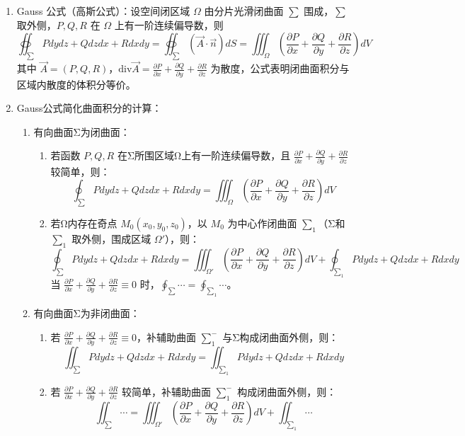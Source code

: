 \documentclass[UTF8]{ctexart}
\theoremstyle{remark}
\begin{document}
\begin{enumerate}
		\item Gauss 公式（高斯公式）：设空间闭区域 \(\Omega\) 由分片光滑闭曲面 \(\sum\) 围成，\(\sum\) 取外侧，\(P,Q,R\) 在 \(\Omega\) 上有一阶连续偏导数，则 
		\[
		\oiint_{\sum} P dydz + Q dzdx + R dxdy = \oiint_{\sum} (\vec{A}\cdot\vec{n}) dS = \iiint_{\Omega} \left(\frac{\partial P}{\partial x} + \frac{\partial Q}{\partial y} + \frac{\partial R}{\partial z}\right) dV
		\]
		其中 \(\vec{A}=(P,Q,R)\)，\(\text{div}\vec{A} = \frac{\partial P}{\partial x} + \frac{\partial Q}{\partial y} + \frac{\partial R}{\partial z}\) 为散度，公式表明闭曲面积分与区域内散度的体积分等价。
	
	\item Gauss公式简化曲面积分的计算：
	\begin{enumerate}
		\item 有向曲面Σ为闭曲面：
		\begin{enumerate}
			\item 若函数 \(P, Q, R\) 在Σ所围区域Ω上有一阶连续偏导数，且 \(\frac{\partial P}{\partial x} + \frac{\partial Q}{\partial y} + \frac{\partial R}{\partial z}\) 较简单，则：
			\[
			\oint_{\sum} P dydz + Q dzdx + R dxdy = \iiint_{\Omega} \left(\frac{\partial P}{\partial x} + \frac{\partial Q}{\partial y} + \frac{\partial R}{\partial z}\right) dV
			\]
			\item 若Ω内存在奇点 \(M_0(x_0, y_0, z_0)\)，以 \(M_0\) 为中心作闭曲面 \(\sum_1\)（Σ和 \(\sum_1\) 取外侧，围成区域 \(\Omega'\)），则：
			\[
			\oint_{\sum} P dydz + Q dzdx + R dxdy = \iiint_{\Omega'} \left(\frac{\partial P}{\partial x} + \frac{\partial Q}{\partial y} + \frac{\partial R}{\partial z}\right) dV + \oint_{\sum_1} P dydz + Q dzdx + R dxdy
			\]
			当 \(\frac{\partial P}{\partial x} + \frac{\partial Q}{\partial y} + \frac{\partial R}{\partial z} \equiv 0\) 时，\(\oint_{\sum} \cdots = \oint_{\sum_1} \cdots\)。
		\end{enumerate}
		\item 有向曲面Σ为非闭曲面：
		\begin{enumerate}
			\item 若 \(\frac{\partial P}{\partial x} + \frac{\partial Q}{\partial y} + \frac{\partial R}{\partial z} \equiv 0\)，补辅助曲面 \(\sum_1^-\) 与Σ构成闭曲面外侧，则：
			\[
			\iint_{\sum} P dydz + Q dzdx + R dxdy = \iint_{\sum_1} P dydz + Q dzdx + R dxdy
			\]
			\item 若 \(\frac{\partial P}{\partial x} + \frac{\partial Q}{\partial y} + \frac{\partial R}{\partial z}\) 较简单，补辅助曲面 \(\sum_1^-\) 构成闭曲面外侧，则：
			\[
			\iint_{\sum} \cdots = \iiint_{\Omega'} \left(\frac{\partial P}{\partial x} + \frac{\partial Q}{\partial y} + \frac{\partial R}{\partial z}\right) dV + \iint_{\sum_1} \cdots
			\]
		\end{enumerate}
	\end{enumerate}
	

\end{enumerate}
\end{document}
